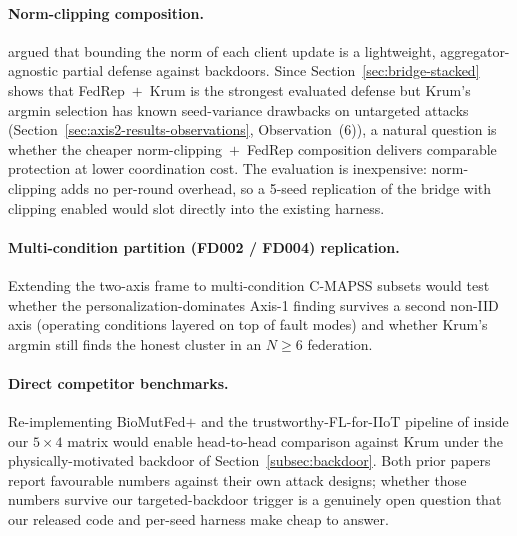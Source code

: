\documentclass[preprint,12pt,authoryear]{elsarticle}
\begin{document}
\paragraph{Norm-clipping composition.}
\citet{Sun2019CanYouBackdoor} argued that bounding the norm of each
client update is a lightweight, aggregator-agnostic partial defense
against backdoors. Since Section~\ref{sec:bridge-stacked} shows
that FedRep~$+$~Krum is the strongest evaluated defense but Krum's
argmin selection has known seed-variance drawbacks on untargeted
attacks (Section~\ref{sec:axis2-results-observations},
Observation~(6)), a natural question is whether the cheaper
norm-clipping~$+$~FedRep composition delivers comparable
protection at lower coordination cost. The evaluation is
inexpensive: norm-clipping adds no per-round overhead, so a 5-seed
replication of the bridge with clipping enabled would slot directly
into the existing harness.

\paragraph{Multi-condition partition (FD002 / FD004) replication.}
Extending the two-axis frame to multi-condition C-MAPSS subsets
would test whether the personalization-dominates Axis-1 finding
survives a second non-IID axis (operating conditions layered on
top of fault modes) and whether Krum's argmin still finds the
honest cluster in an $N \geq 6$ federation.

\paragraph{Direct competitor benchmarks.}
Re-implementing BioMutFed$+$ \citep{Tallat2026BioMutFedPlus} and
the trustworthy-FL-for-IIoT pipeline of
\citet{Li2026TrustworthyFLIIoT} inside our $5 \times 4$ matrix
would enable head-to-head comparison against Krum under the
physically-motivated backdoor of Section~\ref{subsec:backdoor}.
Both prior papers report favourable numbers against their own
attack designs; whether those numbers survive our targeted-backdoor
trigger is a genuinely open question that our released code and
per-seed harness make cheap to answer.



\end{document}

